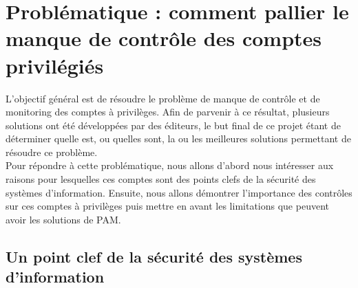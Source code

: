 %
%
%
%
%
%

\section{Problématique : comment pallier le manque de contrôle des comptes privilégiés}

L'objectif général est de résoudre le problème de manque de contrôle et de monitoring des comptes à privilèges. Afin de parvenir à ce résultat, plusieurs solutions ont été développées par des éditeurs, le but final de ce projet étant de déterminer quelle est, ou quelles sont, la ou les meilleures solutions permettant de résoudre ce problème.\\
Pour répondre à cette problématique, nous allons d'abord nous intéresser aux raisons pour lesquelles ces comptes sont des points clefs de la sécurité des systèmes d'information. Ensuite, nous allons démontrer l'importance des contrôles sur ces comptes à privilèges puis mettre en avant les limitations que peuvent avoir les solutions de PAM.

\subsection{Un point clef de la sécurité des systèmes d'information}


